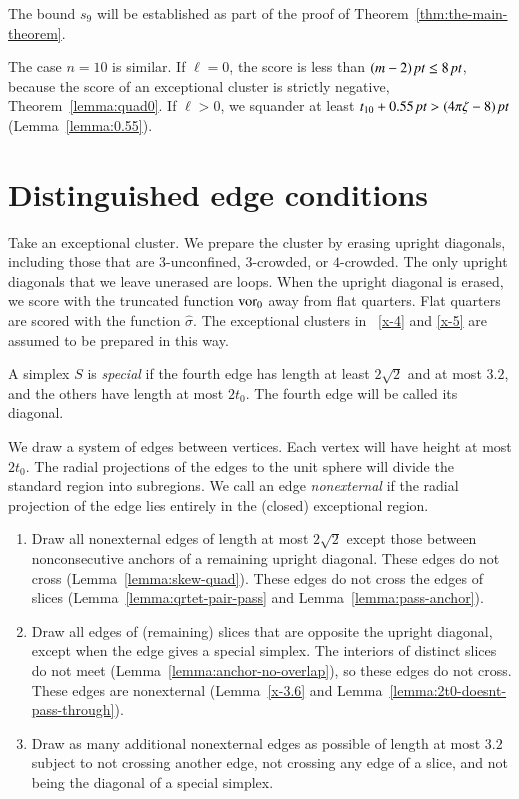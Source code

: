The bound $s_9$ will be established as part of the proof of
Theorem~\ref{thm:the-main-theorem}.

The case $n=10$ is similar.  If $\ell=0$, the score is less than
    $(m-2)\,\hbox{\it pt}\le 8\,\hbox{\it pt}$,
because the score of an exceptional cluster is strictly negative,
Theorem~\ref{lemma:quad0}.  If $\ell>0$, we squander at least
    $t_{10}+ 0.55\,\hbox{\it pt} > (4\pi\zeta-8)\,\hbox{\it pt}$ (Lemma~\ref{lemma:0.55}).


\section{Distinguished edge conditions} %

Take an exceptional cluster.  We prepare the cluster by erasing
upright diagonals, including those that are $3$-unconfined,
$3$-crowded, or $4$-crowded.  The only upright diagonals that we
leave unerased are loops.  When the upright diagonal is erased, we
score with the truncated function $\operatorname{vor}_0$ away from flat
quarters.  Flat quarters are scored with the function
$\hat\sigma$. The exceptional clusters in \Chaps~\ref{x-4} and
\ref{x-5} are assumed to be prepared in this way.


A simplex $S$ is {\it special\/} if the fourth edge has length at
least $2\sqrt{2}$ and at most $3.2$, and the others have length at
most $2t_0$. The fourth edge will be called its diagonal.


We draw a system of edges between vertices.  Each vertex will have
height at most $2t_0$.  The radial projections of the edges to the
unit sphere will divide the standard region into subregions. We
call an edge {\it nonexternal\/} if the radial projection of the
edge lies entirely in the (closed) exceptional region.

\begin{enumerate}
\item Draw all nonexternal edges of length at most $2\sqrt{2}$
except those between nonconsecutive anchors of a remaining upright
diagonal. These edges do not cross (Lemma~\ref{lemma:skew-quad}).
These edges do not cross the edges of slices
(Lemma~\ref{lemma:qrtet-pair-pass} and
Lemma~\ref{lemma:pass-anchor}).

\item Draw all edges of (remaining) slices
that are opposite the upright diagonal, except when the edge gives
a special simplex. The interiors of distinct slices do
not meet (Lemma~\ref{lemma:anchor-no-overlap}), so these edges do
not cross. These edges are nonexternal (Lemma~\ref{x-3.6} and
Lemma~\ref{lemma:2t0-doesnt-pass-through}).

\item Draw as many additional nonexternal edges as possible of
length at most $3.2$ subject to not crossing another edge, not
crossing any edge of a slice, and not being the
diagonal of a special simplex.
\end{enumerate}


